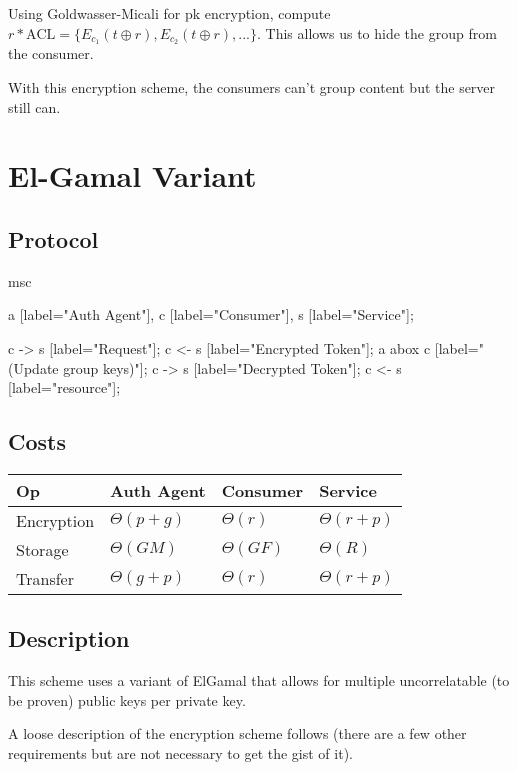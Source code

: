 \documentclass[pdftex,12pt,a4papaer]{article}
\begin{document}
Using Goldwasser-Micali for pk encryption, compute $r*\text{ACL} = \{E_{c_1}(t
\oplus r), E_{c_2}(t \oplus r),...\}$. This allows us to hide the group from the
consumer.

With this encryption scheme, the consumers can't group content but the server
still can.

\pagebreak

\section{El-Gamal Variant}  %

\subsection{Protocol}

\begin{msc}
msc {
    a [label="Auth Agent"],
    c [label="Consumer"],
    s [label="Service"];

    c -> s [label="Request"];
    c <- s [label="Encrypted Token"];
    a abox c [label="(Update group keys)"];
    c -> s [label="Decrypted Token"];
    c <- s [label="resource"];
}
\end{msc}

\subsection{Costs}

\begin{tabular}{l|l|l|l}
 Op & Auth Agent & Consumer & Service \\ \hline
    Encryption & $\Theta(p+g)$ & $\Theta(r)$ & $\Theta(r+p)$ \\
    Storage & $\Theta(GM)$ & $\Theta(GF)$ & $\Theta(R)$ \\
    Transfer & $\Theta(g+p)$ & $\Theta(r)$ & $\Theta(r+p)$
\end{tabular}

\subsection{Description}

This scheme uses a variant of ElGamal that allows for multiple uncorrelatable
(to be proven) public keys per private key.

A loose description of the encryption scheme follows (there are a few other
requirements but are not necessary to get the gist of it).
\end{document}
